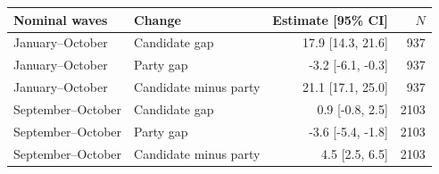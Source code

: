 \begin{tabular}{llrr}
\toprule
Nominal waves & Change & Estimate [95\% CI] & $N$ \\
\midrule
January--October & Candidate gap & 17.9 [14.3, 21.6] &  937 \\
January--October & Party gap & -3.2 [-6.1, -0.3] &  937 \\
January--October & Candidate minus party & 21.1 [17.1, 25.0] &  937 \\
September--October & Candidate gap & 0.9 [-0.8, 2.5] & 2103 \\
September--October & Party gap & -3.6 [-5.4, -1.8] & 2103 \\
September--October & Candidate minus party & 4.5 [2.5, 6.5] & 2103 \\
\bottomrule
\end{tabular}
